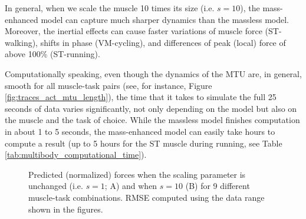 \documentclass{sfuthesis}
\numberwithin{equation}{chapter}
\numberwithin{figure}{chapter}
\numberwithin{table}{chapter}
\theoremstyle{definition}
\begin{document}
In general, when we scale the muscle 10 times its size (i.e. $s=10$), the mass-enhanced model can capture much sharper dynamics than the massless model. Moreover, the inertial effects can cause faster variations of muscle force (ST-walking), shifts in phase (VM-cycling), and differences of peak (local) force of above 100\% (ST-running). 

Computationally speaking, even though the dynamics of the MTU are, in general, smooth for all muscle-task pairs (see, for instance, Figure \ref{fig:traces_act_mtu_length}), the time that it takes to simulate the full 25 seconds of data varies significantly, not only depending on the model but also on the muscle and the task of choice. While the massless model finishes computation in about 1 to 5 seconds, the mass-enhanced model can easily take hours to compute a result (up to 5 hours for the ST muscle during running, see Table \ref{tab:multibody_computational_time}).

\begin{figure} 
    \centering
    \caption{Predicted (normalized) forces when the scaling parameter is unchanged (i.e. $s=1$; A) and when $s=10$ (B) for 9 different muscle-task combinations. RMSE computed using the data range shown in the figures.}
    \label{fig:multibody_predicted_forces_1_10}
\end{figure}
\end{document}
